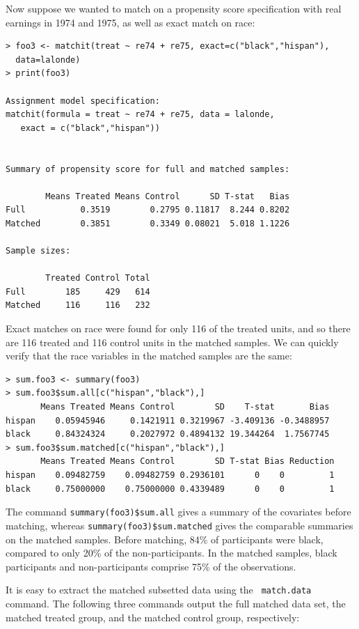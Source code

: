 \documentclass[oneside,letterpaper,titlepage]{article}
\begin{document}
Now suppose we wanted to match on a propensity score specification
with real earnings in 1974 and 1975, as well as exact match on race:

\begin{verbatim}
> foo3 <- matchit(treat ~ re74 + re75, exact=c("black","hispan"),
  data=lalonde)
> print(foo3)
 
Assignment model specification:
matchit(formula = treat ~ re74 + re75, data = lalonde, 
   exact = c("black","hispan"))
 
 
Summary of propensity score for full and matched samples:
    
        Means Treated Means Control      SD T-stat   Bias
Full           0.3519        0.2795 0.11817  8.244 0.8202
Matched        0.3851        0.3349 0.08021  5.018 1.1226
 
Sample sizes:
 
        Treated Control Total
Full        185     429   614
Matched     116     116   232
\end{verbatim}

Exact matches on race were found for only 116 of the treated units,
and so there are 116 treated and 116 control units in the matched
samples.  We can quickly verify that the race variables in the matched
samples are the same:

\begin{verbatim}
> sum.foo3 <- summary(foo3)
> sum.foo3$sum.all[c("hispan","black"),]
       Means Treated Means Control        SD    T-stat       Bias
hispan    0.05945946     0.1421911 0.3219967 -3.409136 -0.3488957
black     0.84324324     0.2027972 0.4894132 19.344264  1.7567745
> sum.foo3$sum.matched[c("hispan","black"),]
       Means Treated Means Control        SD T-stat Bias Reduction
hispan    0.09482759    0.09482759 0.2936101      0    0         1
black     0.75000000    0.75000000 0.4339489      0    0         1
\end{verbatim}

The command {\tt summary(foo3)\$sum.all} gives a summary of the
covariates before matching, whereas {\tt summary(foo3)\$sum.matched}
gives the comparable summaries on the matched samples. Before
matching, 84\% of participants were black, compared to only 20\% of
the non-participants.  In the matched samples, black participants and
non-participants comprise 75\% of the observations.

It is easy to extract the matched subsetted data using the {\tt
  match.data} command.  The following three commands output the full
matched data set, the matched treated group, and the matched control
group, respectively:
\end{document}
